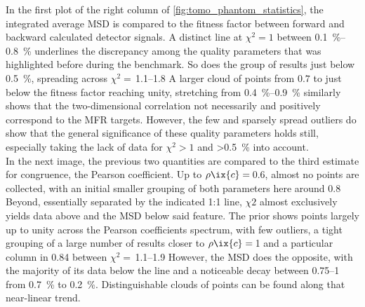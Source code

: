                 In the first plot of the right column of \cref{fig:tomo_phantom_statistics}, the integrated average MSD is compared to the fitness factor between forward and backward calculated detector signals. A distinct line at $\chi^{2}=1$ between \SIrange{0.1}{0.8}{\percent} underlines the discrepancy among the quality parameters that was highlighted before during the benchmark. So does the group of results just below \SI{0.5}{\percent}, spreading across $\chi^{2}=$\,\SIrange{1.1}{1.8}{\arbitraryunit} A larger cloud of points from $0.7$ to just below the fitness factor reaching unity, stretching from \SIrange{0.4}{0.9}{\percent} similarly shows that the two-dimensional correlation not necessarily and positively correspond to the MFR targets. However, the few and sparsely spread outliers do show that the general significance of these quality parameters holds still, especially taking the lack of data for $\chi^{2}>1$ and >\SI{0.5}{\percent} into account.\\%
                In the next image, the previous two quantities are compared to the third estimate for congruence, the Pearson coefficient. Up to $\rho\ix{c}=$\,\SI{0.6}{\arbitraryunit}, almost no points are collected, with an initial smaller grouping of both parameters here around \SI{0.8}{\arbitraryunit} Beyond, essentially separated by the indicated 1:1 line, $\chi{2}$ almost exclusively yields data above and the MSD below said feature. The prior shows points largely up to unity across the Pearson coefficients spectrum, with few outliers, a tight grouping of a large number of results closer to $\rho\ix{c}=$\,\SI{1}{\arbitraryunit} and a particular column in \SI{0.84}{\arbitraryunit} between $\chi^{2}=$\,\SIrange{1.1}{1.9}{\arbitraryunit} However, the MSD does the opposite, with the majority of its data below the line and a noticeable decay between \SIrange{0.75}{1}{\arbitraryunit} from \SI{0.7}{\percent} to \SI{0.2}{\percent}. Distinguishable clouds of points can be found along that near-linear trend.\\%
